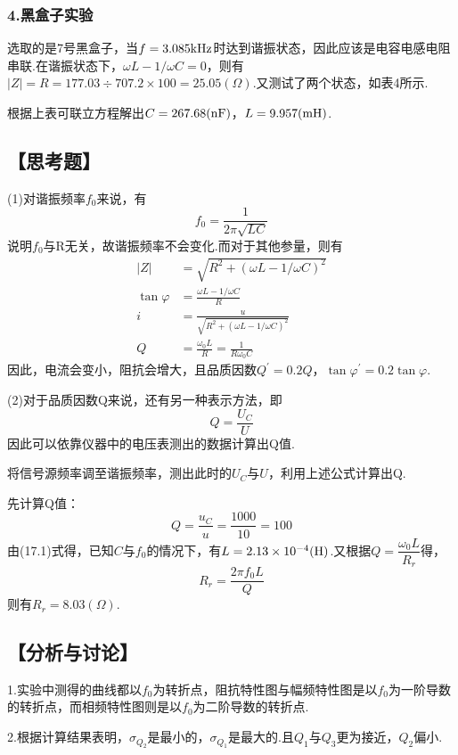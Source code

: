 \documentclass[12pt,a4paper,UTF8]{ctexart}
\begin{document}
\subsubsection*{4.黑盒子实验}
选取的是7号黑盒子，当$f=3.085\rm{kHz}$时达到谐振状态，因此应该是电容电感电阻串联.在谐振状态下，$\omega L-1/\omega C=0$，则有$|Z|=R=177.03\div707.2\times100=25.05(\Omega)$.又测试了两个状态，如表4所示.
\begin{table}[htbp]
\centering
\caption{黑盒子数据表}
\end{table}
\par
根据上表可联立方程解出$C=267.68(\rm{nF})$，$L=9.957(\rm{mH})$.
\subsection*{【思考题】}
(1)对谐振频率$f_0$来说，有
\begin{equation*}
	f_0=\frac{1}{2\pi\sqrt{LC}} \tag{17.1}
\end{equation*}
说明$f_0$与R无关，故谐振频率不会变化.而对于其他参量，则有
\begin{align*}
|Z|&=\sqrt{R^2+(\omega L-1/\omega C)^2} \\
\tan\varphi&=\frac{\omega L-1/\omega C}{R} \\
i&=\frac{u}{\sqrt{R^2+(\omega L-1/\omega C)^2}} \\
Q&=\frac{\omega_0L}{R}=\frac{1}{R\omega_0C}
\end{align*}
因此，电流会变小，阻抗会增大，且品质因数$Q^{\prime}=0.2Q$，$\tan\varphi^{\prime}=0.2\tan\varphi$.\par
(2)对于品质因数Q来说，还有另一种表示方法，即
\begin{equation*}
	Q=\frac{U_C}{U} \tag{17.2}
\end{equation*}
因此可以依靠仪器中的电压表测出的数据计算出Q值.\par
{}将信号源频率调至谐振频率，测出此时的$U_C$与$U$，利用上述公式计算出Q.\par
{}先计算Q值：
\begin{equation*}
	Q=\frac{u_C}{u}=\frac{1000}{10}=100
\end{equation*}
由(17.1)式得，已知$C$与$f_0$的情况下，有$L=2.13\times10^{-4}(\rm{H})$.又根据$Q=\dfrac{\omega_0L}{R_r}$得，
\begin{equation}
	R_r=\frac{2\pi f_0L}{Q} \tag{17.3}
\end{equation}
则有$R_r=8.03(\Omega)$.
\subsection*{【分析与讨论】}
1.实验中测得的曲线都以$f_0$为转折点，阻抗特性图与幅频特性图是以$f_0$为一阶导数的转折点，而相频特性图则是以$f_0$为二阶导数的转折点.\par
2.根据计算结果表明，$\sigma_{Q_2}$是最小的，$\sigma_{Q_1}$是最大的.且$Q_1$与$Q_3$更为接近，$Q_2$偏小.
\end{document}
